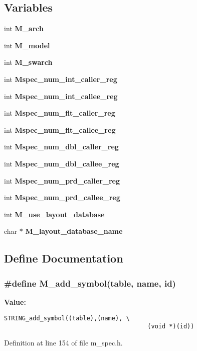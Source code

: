 \subsection*{Variables}
\begin{CompactItemize}
\item 
int \bf{M\_\-arch}
\item 
int \bf{M\_\-model}
\item 
int \bf{M\_\-swarch}
\item 
int \bf{Mspec\_\-num\_\-int\_\-caller\_\-reg}
\item 
int \bf{Mspec\_\-num\_\-int\_\-callee\_\-reg}
\item 
int \bf{Mspec\_\-num\_\-flt\_\-caller\_\-reg}
\item 
int \bf{Mspec\_\-num\_\-flt\_\-callee\_\-reg}
\item 
int \bf{Mspec\_\-num\_\-dbl\_\-caller\_\-reg}
\item 
int \bf{Mspec\_\-num\_\-dbl\_\-callee\_\-reg}
\item 
int \bf{Mspec\_\-num\_\-prd\_\-caller\_\-reg}
\item 
int \bf{Mspec\_\-num\_\-prd\_\-callee\_\-reg}
\item 
int \bf{M\_\-use\_\-layout\_\-database}
\item 
char $\ast$ \bf{M\_\-layout\_\-database\_\-name}
\end{CompactItemize}


\subsection{Define Documentation}
\subsubsection{\setlength{\rightskip}{0pt plus 5cm}\#define M\_\-add\_\-symbol(table, \bf{name}, id)}\label{m__spec_8h_32315e20cf53782a152ab8478f0ac9fa}


\textbf{Value:}

\begin{Code}\begin{verbatim}STRING_add_symbol((table),(name), \
                                        (void *)(id))
\end{verbatim}\end{Code}


Definition at line 154 of file m\_\-spec.h.

